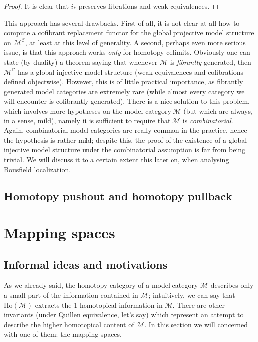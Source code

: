 \begin{refsection}
\begin{proof}
It is clear that $i_*$ preserves fibrations and weak equivalences.
\end{proof}

\begin{rmk}
This approach has several drawbacks. First of all, it is not clear at all how to compute a cofibrant replacement functor for the global projective model structure on $\mathcal M^{\mathcal C}$, at least at this level of generality. A second, perhaps even more serious issue, is that this approach works \emph{only} for homotopy colimits. Obviously one can state (by duality) a theorem saying that whenever $\mathcal M$ is \emph{fibrantly} generated, then $\mathcal M^{\mathcal C}$ has a global injective model structure (weak equivalences and cofibrations defined objectwise). However, this is of little practical importance, as fibrantly generated model categories are extremely rare (while almost every category we will encounter is cofibrantly generated). There is a nice solution to this problem, which involves more hypotheses on the model category $\mathcal M$ (but which are always, in a sense, mild), namely it is sufficient to require that $\mathcal M$ is \emph{combinatorial}. Again, combinatorial model categories are really common in the practice, hence the hypothesis is rather mild; despite this, the proof of the existence of a global injective model structure under the combinatorial assumption is far from being trivial. We will discuss it to a certain extent this later on, when analysing Bousfield localization.
\end{rmk}

\subsection{Homotopy pushout and homotopy pullback}









\section{Mapping spaces}

\subsection{Informal ideas and motivations}

As we already said, the homotopy category of a model category $\mathcal M$ describes only a small part of the information contained in $\mathcal M$; intuitively, we can say that $\mathrm{Ho}(\mathcal M)$ extracts the 1-homotopical information in $\mathcal M$. There are other invariants (under Quillen equivalence, let's say) which represent an attempt to describe the higher homotopical content of $\mathcal M$. In this section we will concerned with one of them: the mapping spaces.


\end{refsection}
